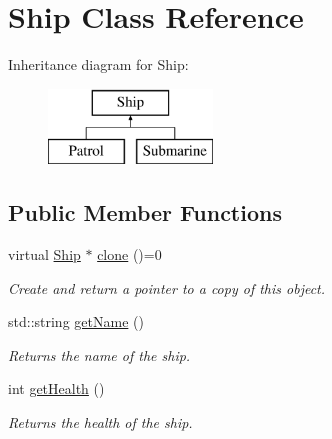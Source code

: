 \hypertarget{class_ship}{}\section{Ship Class Reference}
\label{class_ship}
Inheritance diagram for Ship\+:\begin{figure}[H]
\begin{center}
\leavevmode
\includegraphics[height=2.000000cm]{class_ship}
\end{center}
\end{figure}
\subsection*{Public Member Functions}
\begin{DoxyCompactItemize}
\item 
\hypertarget{class_ship_a929dfa0b467a100d7a9ad52f8a29ef94}{}virtual \hyperlink{class_ship}{Ship} $\ast$ \hyperlink{class_ship_a929dfa0b467a100d7a9ad52f8a29ef94}{clone} ()=0\label{class_ship_a929dfa0b467a100d7a9ad52f8a29ef94}

\begin{DoxyCompactList}\small\item\em Create and return a pointer to a copy of this object. \end{DoxyCompactList}\item 
\hypertarget{class_ship_ad9907b498c9d7f2f0c62fabbc5ab050b}{}std\+::string \hyperlink{class_ship_ad9907b498c9d7f2f0c62fabbc5ab050b}{get\+Name} ()\label{class_ship_ad9907b498c9d7f2f0c62fabbc5ab050b}

\begin{DoxyCompactList}\small\item\em Returns the name of the ship. \end{DoxyCompactList}\item 
\hypertarget{class_ship_afc4fca85c159457aeac07a9f1c21d06e}{}int \hyperlink{class_ship_afc4fca85c159457aeac07a9f1c21d06e}{get\+Health} ()\label{class_ship_afc4fca85c159457aeac07a9f1c21d06e}

\begin{DoxyCompactList}\small\item\em Returns the health of the ship. \end{DoxyCompactList}\end{DoxyCompactItemize}
